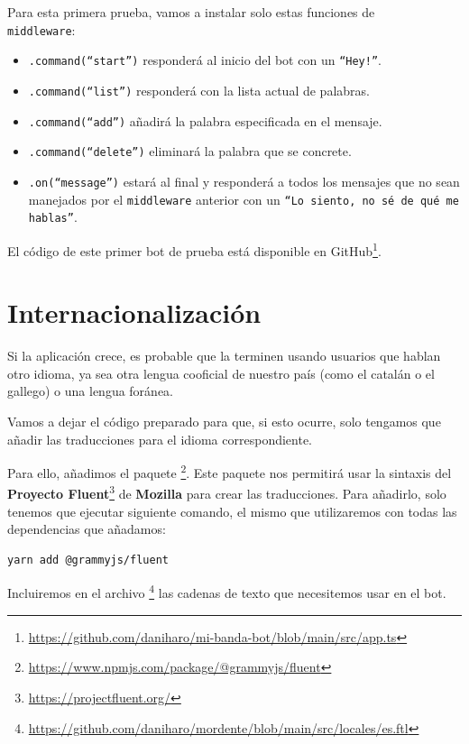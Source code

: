 Para esta primera prueba, vamos a instalar solo estas funciones de \\ \texttt{middleware}:

\begin{itemize}
    \item \texttt{.command(``start'')} responderá al inicio del bot con un \texttt{``Hey!''}.
    \item \texttt{.command(``list'')} responderá con la lista actual de palabras.
    \item \texttt{.command(``add'')} añadirá la palabra especificada en el mensaje.
    \item \texttt{.command(``delete'')} eliminará la palabra que se concrete.
    \item \texttt{.on(``message'')} estará al final y responderá a todos los mensajes que no sean manejados por el \texttt{middleware} anterior con un \texttt{``Lo siento, no sé de qué me hablas''}.
\end{itemize}

El código de este primer bot de prueba está disponible en GitHub\footnote{\url{https://github.com/daniharo/mi-banda-bot/blob/main/src/app.ts}}.

\section{Internacionalización}

Si la aplicación crece, es probable que la terminen usando usuarios que hablan otro idioma, ya sea otra lengua cooficial de nuestro país (como el catalán o el gallego) o una lengua foránea.

Vamos a dejar el código preparado para que, si esto ocurre, solo tengamos que añadir las traducciones para el idioma correspondiente.

Para ello, añadimos el paquete \footnote{\url{https://www.npmjs.com/package/@grammyjs/fluent}}. Este paquete nos permitirá usar la sintaxis del \textbf{Proyecto Fluent}\footnote{\url{https://projectfluent.org/}} de \textbf{Mozilla} para crear las traducciones. Para añadirlo, solo tenemos que ejecutar siguiente comando, el mismo que utilizaremos con todas las dependencias que añadamos:

\begin{verbatim}
yarn add @grammyjs/fluent
\end{verbatim}

Incluiremos en el archivo \footnote{\url{https://github.com/daniharo/mordente/blob/main/src/locales/es.ftl}} las cadenas de texto que necesitemos usar en el bot.

